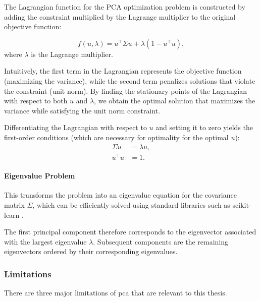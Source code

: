 The Lagrangian function for the PCA optimization problem is constructed by adding the constraint multiplied by the Lagrange multiplier to the original objective function:

\begin{equation}
    f(u,\lambda) = u^\top \Sigma u + \lambda(1 - u^\top u),
\end{equation}
where \(\lambda\) is the Lagrange multiplier.

Intuitively, the first term in the Lagrangian represents the objective function (maximizing the variance), while the second term penalizes solutions that violate the constraint (unit norm). By finding the stationary points of the Lagrangian with respect to both $u$ and $\lambda$, we obtain the optimal solution that maximizes the variance while satisfying the unit norm constraint.

Differentiating the Lagrangian with respect to $u$ and setting it to zero yields the first-order conditions (which are necessary for optimality for the optimal $u$):
\begin{align}
\Sigma u & = \lambda u, \\
u^\top u & = 1.
\end{align}

\paragraph{Eigenvalue Problem}

This transforms the problem into an eigenvalue equation for the \gls{covariance matrix} \(\Sigma\), which can be efficiently solved using standard libraries such as scikit-learn \citep{pedregosa2011scikit}.

The first principal component therefore corresponds to the eigenvector associated with the largest eigenvalue \(\lambda\).
Subsequent components are the remaining eigenvectors ordered by their corresponding eigenvalues.

\subsubsection{Limitations}
There are three major limitations of \acrshort{pca} that are relevant to this thesis.

